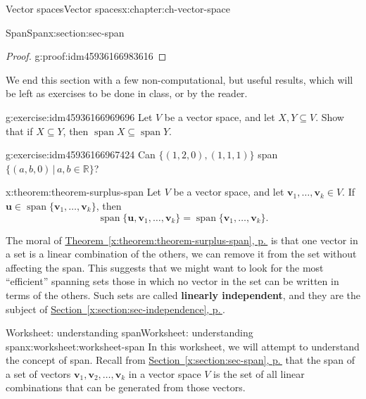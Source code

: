 \documentclass[oneside,10pt,]{book}
\newcommand{\xreffont}{\relax}
\newcommand{\terminology}[1]{\textbf{#1}}
\numberwithin{equation}{section}
\newcommand{\spn}{\operatorname{span}}
\newcommand{\R}{\mathbb{R}}
\newcommand{\uu}{\mathbf{u}}
\newcommand{\vv}{\mathbf{v}}
\begin{document}
\begin{chapterptx}{Vector spaces}{}{Vector spaces}{}{}{x:chapter:ch-vector-space}
\begin{sectionptx}{Span}{}{Span}{}{}{x:section:sec-span}
\begin{proof}{}{g:proof:idm45936166983616}
\end{proof}
We end this section with a few non-computational, but useful results, which will be left as exercises to be done in class, or by the reader.%
\begin{inlineexercise}{}{g:exercise:idm45936166969696}%
Let \(V\) be a vector space, and let \(X,Y\subseteq V\). Show that if \(X\subseteq Y\), then \(\spn X \subseteq \spn Y\).%
\end{inlineexercise}%
\begin{inlineexercise}{}{g:exercise:idm45936166967424}%
Can \(\{(1,2,0), (1,1,1)\}\) span \(\{(a,b,0)\,|\, a,b \in\R\}\)?%
\end{inlineexercise}%
\begin{theorem}{}{}{x:theorem:theorem-surplus-span}%
Let \(V\) be a vector space, and let \(\vv_1,\ldots, \vv_k\in V\). If \(\uu\in \spn\{\vv_1,\ldots, \vv_k\}\), then%
\begin{equation*}
\spn\{\uu,\vv_1,\ldots, \vv_k\} = \spn\{\vv_1,\ldots, \vv_k\}\text{.}
\end{equation*}
%
\end{theorem}
The moral of \hyperref[x:theorem:theorem-surplus-span]{Theorem~{\xreffont\ref{x:theorem:theorem-surplus-span}}, p.\,\pageref{x:theorem:theorem-surplus-span}} is that one vector in a set is a linear combination of the others, we can remove it from the set without affecting the span. This suggests that we might want to look for the most ``efficient'' spanning sets \textendash{} those in which no vector in the set can be written in terms of the others. Such sets are called \terminology{linearly independent}, and they are the subject of \hyperref[x:section:sec-independence]{Section~{\xreffont\ref{x:section:sec-independence}}, p.\,\pageref{x:section:sec-independence}}.%
\end{sectionptx}
%
%
\typeout{************************************************}
\typeout{************************************************}
%
\begin{worksheet-section}{Worksheet: understanding span}{}{Worksheet: understanding span}{}{}{x:worksheet:worksheet-span}
In this worksheet, we will attempt to understand the concept of span. Recall from \hyperref[x:section:sec-span]{Section~{\xreffont\ref{x:section:sec-span}}, p.\,\pageref{x:section:sec-span}} that the span of a set of vectors \(\vv_1, \vv_2,\ldots, \vv_k\) in a vector space \(V\) is the set of all linear combinations that can be generated from those vectors.%

\end{worksheet-section}
\end{chapterptx}
\end{document}
